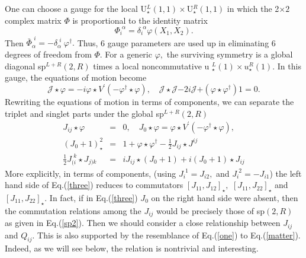 \documentclass[a4paper,12pt]{article}
\begin{document}
One can choose a gauge for the local U$_{\star }^{L}\left( 1,1\right) \times 
$U$_{\star }^{R}\left( 1,1\right) $ in which the 2$\times 2$ complex matrix $%
\Phi $ is proportional to the identity matrix 
\begin{equation}
\Phi _{i}^{\,\,\alpha }=\delta _{i}^{\,\,\alpha }\varphi \left(
X_{1},X_{2}\right) .
\end{equation}
Then $\bar{\Phi}_{\alpha }^{\,\,i}=-\delta _{\alpha }^{\,\,i\,\,}\varphi
^{\dagger }.$ Thus, 6 gauge parameters are used up in eliminating 6 degrees
of freedom from $\Phi .$ For a generic $\varphi ,$ the surviving symmetry is
a global diagonal sp$^{L+R}\left( 2,R\right) $ times a local noncommutative u%
$_{\star }^{L}\left( 1\right) \times u_{\star }^{R}\left( 1\right) .$ In
this gauge, the equations of motion become 
\begin{equation}
\mathcal{J}\star \varphi =-i\varphi \star V^{\prime }\left( -\varphi
^{\dagger }\star \varphi \right) ,\quad \mathcal{J}\star \mathcal{J}\mathbf{-%
}2i\mathcal{J}\mathbf{+}\left( \varphi \star \varphi ^{\dagger }\right) 1%
\mathbf{=}0.
\end{equation}
Rewriting the equations of motion in terms of components, we can separate
the triplet and singlet parts under the global sp$^{L+R}\left( 2,R\right) $ 
\begin{eqnarray}
J_{ij}\star \varphi &=&0,\quad J_{0}\star \varphi =\varphi \star V^{\prime
}\left( -\varphi ^{\dagger }\star \varphi \right) ,  \label{one} \\
\left( J_{0}+1\right) _{\star }^{2} &=&1+\varphi \star \varphi ^{\dagger }-%
\frac{1}{2}J_{ij}\star J^{ij}  \label{two} \\
\frac{1}{2}J_{(i}^{\,\,k}\star J_{j)k} &=&iJ_{ij}\star \left( J_{0}+1\right)
+i\left( J_{0}+1\right) \star J_{ij}  \label{three}
\end{eqnarray}
More explicitly, in terms of components, (using $J_{i}^{\,\,1}=J_{i2},$ and $%
J_{i}^{\,\,2}=-J_{i1}$) the left hand side of Eq.(\ref{three}) reduces to
commutators $\left[ J_{11},J_{12}\right] _{\star },$ $\left[ J_{11},J_{22}%
\right] _{\star }$ and $\left[ J_{11},J_{22}\right] _{\star }.$ In fact, if
in Eq.(\ref{three}) $J_{0}$ on the right hand side were absent, then the
commutation relations among the $J_{ij}$ would be precisely those of sp$%
\left( 2,R\right) $ as given in Eq.(\ref{sp2}). Then we should consider a
close relationship between $J_{ij}$ and $Q_{ij}.$ This is also supported by
the resemblance of Eq.(\ref{one}) to Eq.(\ref{matter}). Indeed, as we will
see below, the relation is nontrivial and interesting.
\end{document}
